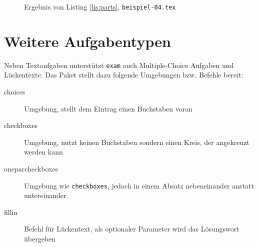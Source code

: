 \begin{figure}[b]
\caption{Ergebnis von Listing \ref{lis:parts}, \texttt{beispiel-04.tex}}\label{fig:allparts}
\end{figure}


\section{Weitere Aufgabentypen}

Neben Textaufgaben unterstützt \texttt{exam} auch Multiple-Choice Aufgaben und Lückentexte. Das Paket stellt dazu folgende Umgebungen bzw. Befehle bereit:

\begin{description}
\item[choices] Umgebung, stellt dem Eintrag einen Buchstaben voran
\item[checkboxes] Umgebung, nutzt keinen Buchstaben sondern einen Kreis, der angekreuzt werden kann
\item[oneparcheckboxes] Umgebung wie \texttt{checkboxes}, jedoch in einem Absatz nebeneinander anstatt untereinander
\item[fillin] Befehl für Lückentext, als optionaler Parameter wird das Lösungswort übergeben
\end{description}

